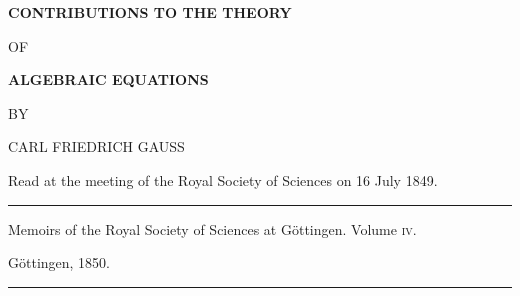 \clearpage
{}
\thispagestyle{empty}
\begin{center}
\vspace*{.45in}
{\Large\bfseries CONTRIBUTIONS TO THE THEORY\par}
\bigskip
OF\par
\bigskip
{\Large\bfseries ALGEBRAIC EQUATIONS\par}
\bigskip\bigskip
BY\par
\bigskip
{\large CARL FRIEDRICH GAUSS\par}
\bigskip
Read at the meeting of the Royal Society of Sciences
on 16 July 1849.\par
\bigskip
\rule{0.6\linewidth}{0.4pt}\par
Memoirs of the Royal Society of Sciences at Göttingen.
Volume \textsc{iv}.\par
Göttingen, 1850.\par
\rule{0.6\linewidth}{0.4pt}
\end{center}
\clearpage

